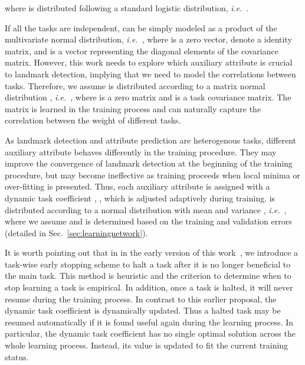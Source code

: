 \documentclass[10pt,journal,compsoc]{IEEEtran}
\newcommand{\ie}{\emph{i.e.}~}
\begin{document}
where  is distributed following a standard logistic distribution, \ie .






If all the tasks are independent,  can be simply modeled as a product of the multivariate normal distribution, \ie , where  is a  zero vector,  denote a  identity matrix, and  is a  vector representing the diagonal elements of the covariance matrix.
However, this work needs to explore which auxiliary attribute is crucial to landmark detection, implying that we need to model the correlations between tasks.
Therefore, we assume  is distributed according to a matrix normal distribution \cite{gupta1999matrix}, \ie , where  is a  zero matrix and  is a  task covariance matrix. The matrix  is learned in the training process and can naturally capture the correlation between the weight of different tasks.



As landmark detection and attribute prediction are heterogenous tasks, different auxiliary attribute behaves differently in the training procedure. They may improve the convergence of landmark detection at the beginning of the training procedure, but may become ineffective as training proceeds when local minima or over-fitting is presented.
Thus, each auxiliary attribute is assigned with a dynamic task coefficient , , which is adjusted adaptively during training.
 is distributed according to a normal distribution with mean  and variance , \ie , where we assume  and  is determined based on the training and validation errors (detailed in Sec.~\ref{sec:learningnetwork}).



It is worth pointing out that in in the early version of this work~\cite{zhang2014facial}, we introduce a task-wise early stopping scheme to halt a task after it is no longer beneficial to the main task. This method is heuristic and the criterion to determine when to stop learning a task is empirical. In addition, once a task is halted, it will never resume during the training process.
In contrast to this earlier proposal, the dynamic task coefficient is dynamically updated. Thus a halted task may be resumed automatically if it is found useful again during the learning process. In particular, the dynamic task coefficient has no single optimal solution across the whole learning process. Instead, its value is updated to fit the current training status.
\end{document}
